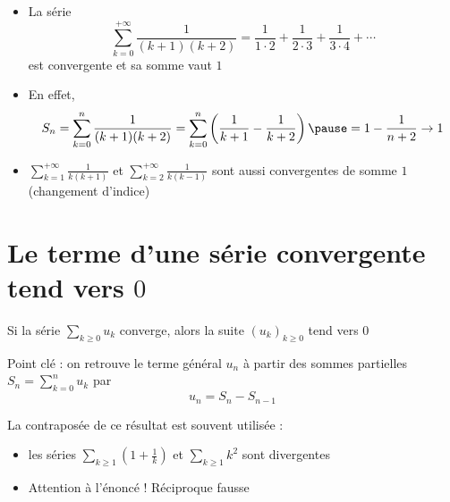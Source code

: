 
\begin{frame}
\begin{exemple}
\begin{itemize}
\item La série $$\sum_{k=0}^{+\infty} \frac{1}{(k+1)(k+2)}=\frac{1}{1\cdot 2}+\frac{1}{2\cdot 3}+
 \frac{1}{3\cdot 4}+\cdots$$
est convergente et sa somme vaut $1$

\item\pause En effet,
$$S_n=\sum_{k=0}^n \frac{1}{(k+1)(k+2)} = \sum_{k=0}^n \left(\frac{1}{k+1}-\frac{1}{k+2}\right)
\pause = 1 - \frac{1}{n+2} \to 1 $$

\item\pause $\displaystyle\sum_{k=1}^{+\infty} \frac{1}{k(k+1)}$ et 
$\displaystyle\sum_{k=2}^{+\infty} \frac{1}{k(k-1)}$ sont aussi convergentes de somme $1$ (changement d'indice)
\end{itemize}
\end{exemple}
\end{frame}

\section{Le terme d'une série convergente tend vers $0$}

\begin{frame}
\begin{theoreme}
Si la série $\sum_{k\ge0} u_k$ converge, 
alors la suite $(u_k)_{k \ge 0}$ tend vers $0$
\end{theoreme}

\pause
Point clé : on retrouve le terme général $u_n$ à partir des sommes partielles $S_n=\sum_{k=0}^{n} u_k$ par
\vspace{-.2cm}
$$u_n = S_n - S_{n-1}$$

\pause
La contraposée de ce résultat est souvent utilisée : 

\begin{itemize}
\item\pause les séries $\sum_{k \ge 1} (1+\frac{1}{k})$ et $\sum_{k \ge 1} k^2$ sont divergentes
\item\pause Attention à l'énoncé ! Réciproque fausse

\end{itemize}
\end{frame}


